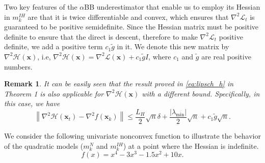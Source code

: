\documentclass{elsarticle}
\newtheorem{remark}{Remark}
\numberwithin{equation}{section}
\begin{document}
{T}wo key features of the $\alpha$BB underestimator that enable us to employ its Hessian in $m_k^{IH}$ are that it is twice differentiable and convex, which ensures that $\nabla^2\mathcal{L}_t$ is guaranteed to be positive semidefinite. Since the Hessian matrix must be positive definite to ensure that the direct is descent,  therefore to make $\nabla^2\mathcal{L}_t$ positive definite, we add a positive term $c_1\tilde{g}$ in it. We denote this new matrix by $\nabla^{2}\mathcal{H}(\mathbf{x})$, i.e, $\nabla^{2}\mathcal{H}(\mathbf{x})=\nabla^{2}\mathcal{L}(\mathbf{x})+c_1\tilde{g}I$, where $c_1$ and $\tilde{g}$ are real positive numbers.


\begin{remark}
It can be easily seen that the result proved in \eqref{eq:lipsch_h} in Theorem 1 is also applicable for $\nabla^{2}\mathcal{H}(\mathbf{x})$ with a different bound. Specifically, in this case, we have 
\begin{equation}\label{boundhx}
\left\| \nabla^2 \mathcal{H}(\mathbf{x}_t) - \nabla^2 f(\mathbf{x}_k) \right\| \leq \frac{L_H}{2} \sqrt{n} \delta + \frac{|\lambda_{\min}|}{2} \sqrt{n}+c_1\tilde{g}\sqrt{n}.
\end{equation} 
\end{remark}

We consider the following univariate nonconvex function to illustrate the behavior of the quadratic models ($m_k^N$ and $m_k^{IH}$) at a point where the Hessian is indefinite. 
\[
f(x) = x^4 - 3x^3 - 1.5x^2 + 10x.
\]
\end{document}
